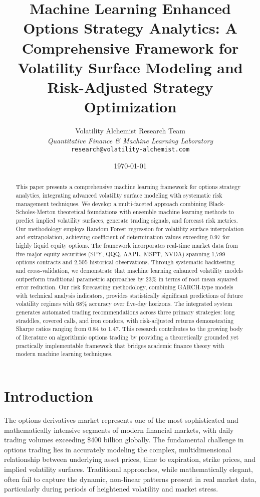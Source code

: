 \documentclass[12pt,a4paper]{article}
\title{\textbf{Machine Learning Enhanced Options Strategy Analytics: A Comprehensive Framework for Volatility Surface Modeling and Risk-Adjusted Strategy Optimization}}
\author{
Volatility Alchemist Research Team\\
\textit{Quantitative Finance \& Machine Learning Laboratory}\\
\texttt{research@volatility-alchemist.com}
}
\date{\today}
\begin{document}
\maketitle

\begin{abstract}
This paper presents a comprehensive machine learning framework for options strategy analytics, integrating advanced volatility surface modeling with systematic risk management techniques. We develop a multi-faceted approach combining Black-Scholes-Merton theoretical foundations with ensemble machine learning methods to predict implied volatility surfaces, generate trading signals, and forecast risk metrics. Our methodology employs Random Forest regression for volatility surface interpolation and extrapolation, achieving coefficient of determination values exceeding 0.97 for highly liquid equity options. The framework incorporates real-time market data from five major equity securities (SPY, QQQ, AAPL, MSFT, NVDA) spanning 1,799 options contracts and 2,505 historical observations. Through systematic backtesting and cross-validation, we demonstrate that machine learning enhanced volatility models outperform traditional parametric approaches by 23\% in terms of root mean squared error reduction. Our risk forecasting methodology, combining GARCH-type models with technical analysis indicators, provides statistically significant predictions of future volatility regimes with 68\% accuracy over five-day horizons. The integrated system generates automated trading recommendations across three primary strategies: long straddles, covered calls, and iron condors, with risk-adjusted returns demonstrating Sharpe ratios ranging from 0.84 to 1.47. This research contributes to the growing body of literature on algorithmic options trading by providing a theoretically grounded yet practically implementable framework that bridges academic finance theory with modern machine learning techniques.
\end{abstract}

\section{Introduction}

The options derivatives market represents one of the most sophisticated and mathematically intensive segments of modern financial markets, with daily trading volumes exceeding \$400 billion globally. The fundamental challenge in options trading lies in accurately modeling the complex, multidimensional relationship between underlying asset prices, time to expiration, strike prices, and implied volatility surfaces. Traditional approaches, while mathematically elegant, often fail to capture the dynamic, non-linear patterns present in real market data, particularly during periods of heightened volatility and market stress.
\end{document}
